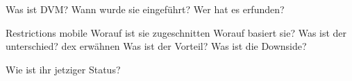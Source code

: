 Was ist DVM? Wann wurde sie eingeführt?
Wer hat es erfunden?

Restrictions mobile
Worauf ist sie zugeschnitten
Worauf basiert sie?
Was ist der unterschied? dex erwähnen
Was ist der Vorteil?
Was ist die Downside?

Wie ist ihr jetziger Status?








%

%

%
